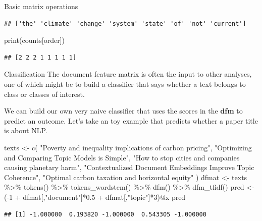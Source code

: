\documentclass[
  10pt,
  ignorenonframetext,
  aspectratio=169]{beamer}
\newenvironment{Shaded}{\begin{snugshade}}{\end{snugshade}}
\newcommand{\BuiltInTok}[1]{\textcolor[rgb]{0.80,0.80,0.80}{#1}}
\newcommand{\DecValTok}[1]{\textcolor[rgb]{0.86,0.86,0.80}{#1}}
\newcommand{\FloatTok}[1]{\textcolor[rgb]{0.75,0.75,0.82}{#1}}
\newcommand{\FunctionTok}[1]{\textcolor[rgb]{0.94,0.94,0.56}{#1}}
\newcommand{\NormalTok}[1]{\textcolor[rgb]{0.80,0.80,0.80}{#1}}
\newcommand{\OtherTok}[1]{\textcolor[rgb]{0.94,0.94,0.56}{#1}}
\newcommand{\SpecialCharTok}[1]{\textcolor[rgb]{0.86,0.64,0.64}{#1}}
\newcommand{\StringTok}[1]{\textcolor[rgb]{0.80,0.58,0.58}{#1}}
\begin{document}
\begin{frame}[fragile]{Basic matrix operations}
\begin{verbatim}
## ['the' 'climate' 'change' 'system' 'state' 'of' 'not' 'current']
\end{verbatim}

\begin{Shaded}
\begin{Highlighting}[]
\BuiltInTok{print}\NormalTok{(counts[order])}
\end{Highlighting}
\end{Shaded}

\begin{verbatim}
## [2 2 2 1 1 1 1 1]
\end{verbatim}
\end{frame}

\begin{frame}[fragile]{Classification}
\protect\hypertarget{classification}{}
The document feature matrix is often the input to other analyses, one of
which might be to build a classifier that says whether a text belongs to
class or classes of interest.

We can build our own very naive classifier that uses the scores in the
\textbf{dfm} to predict an outcome. Let's take an toy example that
predicts whether a paper title is about NLP.

\scriptsize

\begin{Shaded}
\begin{Highlighting}[]
\NormalTok{texts }\OtherTok{\textless{}{-}} \FunctionTok{c}\NormalTok{(}
  \StringTok{"Poverty and inequality implications of carbon pricing"}\NormalTok{,}
  \StringTok{"Optimizing and Comparing Topic Models is Simple"}\NormalTok{,}
  \StringTok{"How to stop cities and companies causing planetary harm"}\NormalTok{,}
  \StringTok{"Contextualized Document Embeddings Improve Topic Coherence"}\NormalTok{,}
  \StringTok{"Optimal carbon taxation and horizontal equity"}
\NormalTok{)}
\NormalTok{dfmat }\OtherTok{\textless{}{-}}\NormalTok{ texts }\SpecialCharTok{\%\textgreater{}\%}
  \FunctionTok{tokens}\NormalTok{() }\SpecialCharTok{\%\textgreater{}\%}
  \FunctionTok{tokens\_wordstem}\NormalTok{() }\SpecialCharTok{\%\textgreater{}\%} 
  \FunctionTok{dfm}\NormalTok{() }\SpecialCharTok{\%\textgreater{}\%}
  \FunctionTok{dfm\_tfidf}\NormalTok{()}
\NormalTok{pred }\OtherTok{\textless{}{-}}\NormalTok{ (}\SpecialCharTok{{-}}\DecValTok{1} \SpecialCharTok{+}\NormalTok{ dfmat[,}\StringTok{"document"}\NormalTok{]}\SpecialCharTok{*}\FloatTok{0.5} \SpecialCharTok{+}\NormalTok{ dfmat[,}\StringTok{"topic"}\NormalTok{]}\SpecialCharTok{*}\DecValTok{3}\NormalTok{)}\SpecialCharTok{@}\NormalTok{x}
\NormalTok{pred}
\end{Highlighting}
\end{Shaded}

\begin{verbatim}
## [1] -1.000000  0.193820 -1.000000  0.543305 -1.000000
\end{verbatim}
\end{frame}
\end{document}
